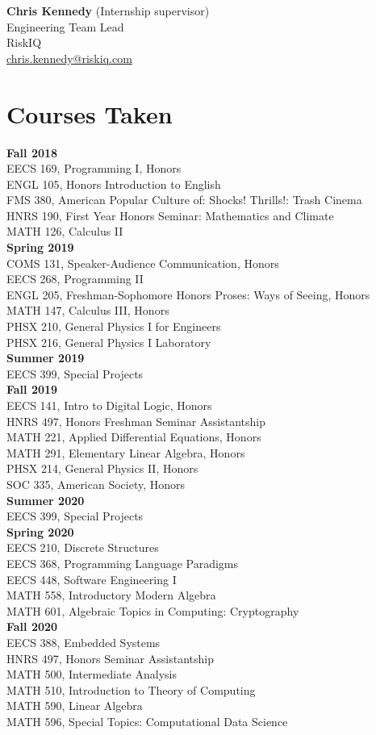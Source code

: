 \documentclass[a4paper, 10pt]{article}
\begin{document}
\textbf{Chris Kennedy} (Internship supervisor)\\
Engineering Team Lead\\
RiskIQ\\
\href{mailto:chris.kennedy@riskiq.com}{chris.kennedy@riskiq.com}

\section{Courses Taken}
\textbf{Fall 2018}\\
EECS 169, Programming I, Honors\\
ENGL 105, Honors Introduction to English\\
FMS 380, American Popular Culture of: Shocks! Thrills!: Trash Cinema\\
HNRS 190, First Year Honors Seminar: Mathematics and Climate\\
MATH 126, Calculus II\\
\textbf{Spring 2019}\\
COMS 131, Speaker-Audience Communication, Honors\\
EECS 268, Programming II\\
ENGL 205, Freshman-Sophomore Honors Proses: Ways of Seeing, Honors\\
MATH 147, Calculus III, Honors\\
PHSX 210, General Physics I for Engineers\\
PHSX 216, General Physics I Laboratory\\
\textbf{Summer 2019}\\
EECS 399, Special Projects\\
\textbf{Fall 2019}\\
EECS 141, Intro to Digital Logic, Honors\\
HNRS 497, Honors Freshman Seminar Assistantship\\
MATH 221, Applied Differential Equations, Honors\\
MATH 291, Elementary Linear Algebra, Honors\\
PHSX 214, General Physics II, Honors\\
SOC 335, American Society, Honors\\
\textbf{Summer 2020}\\
EECS 399, Special Projects\\
\textbf{Spring 2020}\\
EECS 210, Discrete Structures\\
EECS 368, Programming Language Paradigms\\
EECS 448, Software Engineering I\\
MATH 558, Introductory Modern Algebra\\
MATH 601, Algebraic Topics in Computing: Cryptography\\
\textbf{Fall 2020}\\
EECS 388, Embedded Systems\\
HNRS 497, Honors Seminar Assistantship\\
MATH 500, Intermediate Analysis\\
MATH 510, Introduction to Theory of Computing\\
MATH 590, Linear Algebra\\
MATH 596, Special Topics: Computational Data Science\\
\end{document}

